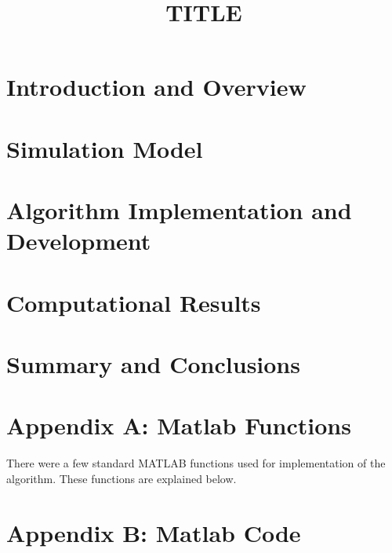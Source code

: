 \documentclass[conference]{IEEEtran}
\begin{document}
\title{TITLE}

\author{
}
\maketitle

\begin{abstract}

\end{abstract}

\section{Introduction and Overview}
    

\section{Simulation Model}
    

\section{Algorithm Implementation and Development}

\section{Computational Results}

\section{Summary and Conclusions}

\section{Appendix A: Matlab Functions}

There were a few standard MATLAB functions used for implementation of the algorithm. These functions are explained below. 

\section{Appendix B: Matlab Code}
\end{document}
